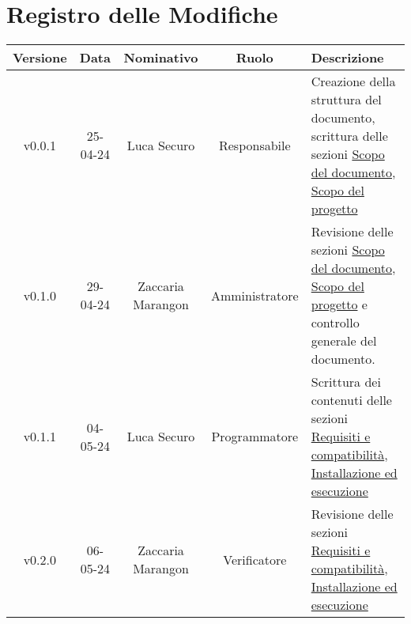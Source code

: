 \section*{\Large Registro delle Modifiche}
    \begin{table}[h]
        \centering
        \renewcommand\tabularxcolumn[1]{m{#1}} %
        \renewcommand{\arraystretch}{1.5}
        \begin{tabularx}{0.98\textwidth}
            {c|c|c|c|>{\centering\arraybackslash}X}
            \rowcolor{black}
            \textbf{\color{white} Versione} & \textbf{\color{white} Data} & \textbf{\color{white} Nominativo} & \textbf{\color{white} Ruolo} & \textbf{\color{white} Descrizione} \\ 
            \hline

            
            
            v0.0.1 & 25-04-24 & Luca Securo & Responsabile & Creazione della struttura del documento, scrittura delle sezioni \hyperref[sec:scopo_del_documento]{Scopo del documento}, 
                                                             \hyperref[sec:scopo_del_progetto]{Scopo del progetto}\\
            v0.1.0 & 29-04-24 & Zaccaria Marangon & Amministratore & Revisione delle sezioni \hyperref[sec:scopo_del_documento]{Scopo del documento}, 
                                                                     \hyperref[sec:scopo_del_progetto]{Scopo del progetto} e controllo generale del documento.\\
            v0.1.1 & 04-05-24 & Luca Securo & Programmatore & Scrittura dei contenuti delle sezioni \hyperref[sec:requisiti_e_compatibilità]{Requisiti
                                                            e compatibilità}, \hyperref[sec:install_run]{Installazione ed esecuzione}\\
            v0.2.0 & 06-05-24 & Zaccaria Marangon & Verificatore & Revisione delle sezioni \hyperref[sec:requisiti_e_compatibilità]{Requisiti
                                                            e compatibilità}, \hyperref[sec:install_run]{Installazione ed esecuzione}\\
            
               
            
            \hline
        \end{tabularx}
    \end{table}